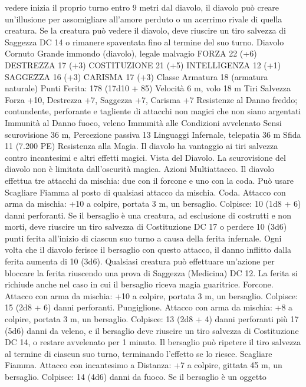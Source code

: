 \begin{multicols}{2}
vedere inizia il proprio turno entro 9 metri dal diavolo, il diavolo
può creare un’illusione per assomigliare all’amore perduto o un
acerrimo rivale di quella creatura. Se la creatura può vedere il
diavolo, deve riuscire un tiro salvezza di Saggezza DC 14 o
rimanere spaventata fino al termine del suo turno.
Diavolo Cornuto
Grande immondo (diavolo), legale malvagio
FORZA 22 (+6)
DESTREZZA 17 (+3)
COSTITUZIONE 21 (+5)
INTELLIGENZA 12 (+1)
SAGGEZZA 16 (+3)
CARISMA 17 (+3)
Classe Armatura 18 (armatura naturale)
\hspace*{0pt}\hfill{Punti Ferita}: 178 (17d10 + 85)
Velocità 6 m, volo 18 m
Tiri Salvezza Forza +10, Destrezza +7, Saggezza +7, Carisma
+7
Resistenze al Danno freddo; contundente, perforante e tagliente
di attacchi non magici che non siano argentati
Immunità al Danno fuoco, veleno
Immunità alle Condizioni avvelenato
Sensi scurovisione 36 m, Percezione passiva 13
Linguaggi Infernale, telepatia 36 m
Sfida 11 (7.200 PE)
Resistenza alla Magia. Il diavolo ha vantaggio ai tiri salvezza
contro incantesimi e altri effetti magici.
Vista del Diavolo. La scurovisione del diavolo non è limitata
dall’oscurità magica.
Azioni
Multiattacco. Il diavolo effettua tre attacchi da mischia: due con
il forcone e uno con la coda. Può usare Scagliare Fiamma al
posto di qualsiasi attacco da mischia.
Coda. Attacco con arma da mischia: +10 a colpire, portata 3 m,
un bersaglio.
Colpisce: 10 (1d8 + 6) danni perforanti. Se il bersaglio è una
creatura, ad esclusione di costrutti e non morti, deve riuscire un
tiro salvezza di Costituzione DC 17 o perdere 10 (3d6) punti
ferita all’inizio di ciascun suo turno a causa della ferita infernale.
Ogni volta che il diavolo ferisce il bersaglio con questo attacco,
il danno inflitto dalla ferita aumenta di 10 (3d6). Qualsiasi
creatura può effettuare un’azione per bloccare la ferita riuscendo
una prova di Saggezza (Medicina) DC 12. La ferita si richiude
anche nel caso in cui il bersaglio riceva magia guaritrice.
Forcone. Attacco con arma da mischia: +10 a colpire, portata 3
m, un bersaglio.
Colpisce: 15 (2d8 + 6) danni perforanti.
Pungiglione. Attacco con arma da mischia: +8 a colpire, portata
3 m, un bersaglio.
Colpisce: 13 (2d8 + 4) danni perforanti più 17 (5d6) danni da
veleno, e il bersaglio deve riuscire un tiro salvezza di
Costituzione DC 14, o restare avvelenato per 1 minuto. Il
bersaglio può ripetere il tiro salvezza al termine di ciascun suo
turno, terminando l’effetto se lo riesce.
Scagliare Fiamma. Attacco con incantesimo a Distanza: +7 a
colpire, gittata 45 m, un bersaglio.
Colpisce: 14 (4d6) danni da fuoco. Se il bersaglio è un oggetto

\end{multicols}
